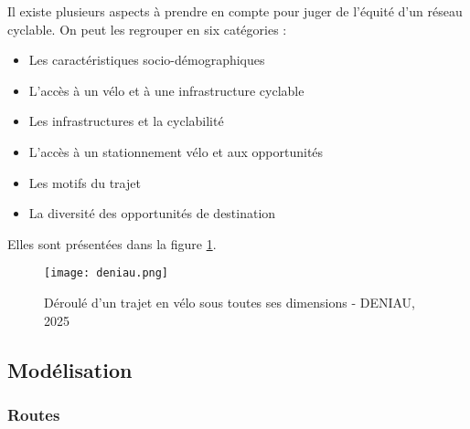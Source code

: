 \documentclass[a4paper,12pt,french]{article}
\begin{document}
Il existe plusieurs aspects à prendre en compte pour juger de l'équité d'un réseau cyclable. On peut les regrouper en six catégories : 


\begin{itemize} \label{categories_eq}
    \item Les caractéristiques socio-démographiques
    \item L'accès à un vélo et à une infrastructure cyclable
    \item Les infrastructures et la cyclabilité
    \item L'accès à un stationnement vélo et aux opportunités
    \item Les motifs du trajet
    \item La diversité des opportunités de destination
\end{itemize}
Elles sont présentées dans la figure \ref{fig:d1}.

\begin{figure}[h]
    \centering
    \texttt{[image: deniau.png]}
    \caption{Déroulé d'un trajet en vélo sous toutes ses dimensions - DENIAU, 2025}
    \label{fig:d1}
\end{figure}

\subsection{Modélisation}

\subsubsection{Routes}
\end{document}
